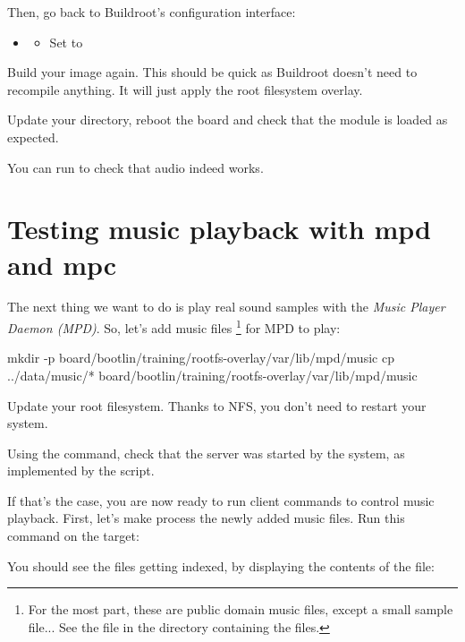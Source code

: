 Then, go back to Buildroot's configuration interface:
\begin{itemize}
\item {}
  \begin{itemize}
  \item Set  to
  \end{itemize}
\end{itemize}

Build your image again. This should be quick as Buildroot doesn't need
to recompile anything. It will just apply the root filesystem overlay.

Update your  directory, reboot the board and check
that the  module is loaded as expected.

You can run  to check that audio indeed works.

\section{Testing music playback with mpd and mpc}

The next thing we want to do is play real sound samples with
the {\em Music Player Daemon (MPD)}. So, let's add music files
\footnote{For the most part, these are public domain
music files, except a small sample file... See the 
file in the directory containing the files.}
for MPD to play:

\begin{bashinput}
mkdir -p board/bootlin/training/rootfs-overlay/var/lib/mpd/music
cp ../data/music/* board/bootlin/training/rootfs-overlay/var/lib/mpd/music
\end{bashinput}

Update your root filesystem. Thanks to NFS, you don't need to restart
your system.

Using the  command, check that the  server
was started by the system, as implemented by the
 script.

If that's the case, you are now ready to run  client commands
to control music playback. First, let's make  process the
newly added music files. Run this command on the target:


You should see the files getting indexed, by displaying the contents
of the  file:

